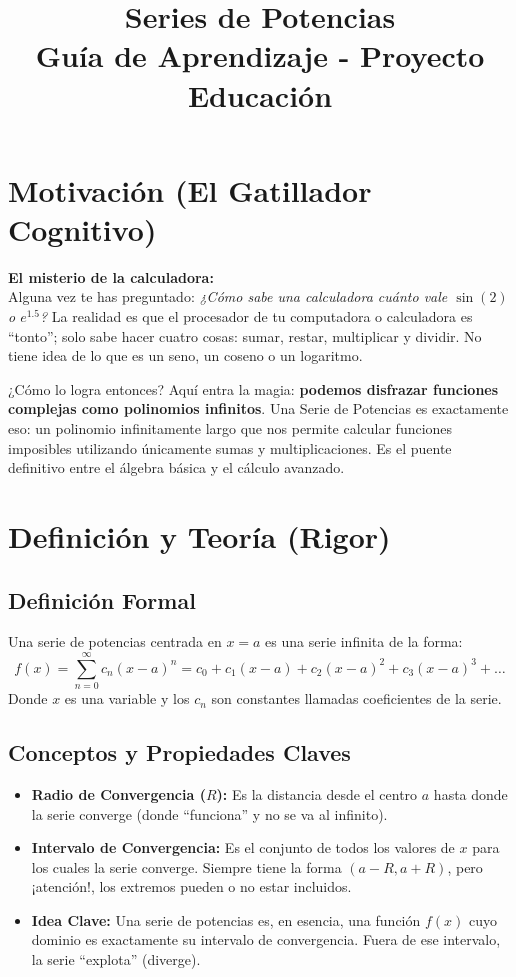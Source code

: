 \documentclass[11pt, a4paper]{article}
\title{\textbf{Series de Potencias}\\ \large Guía de Aprendizaje - Proyecto Educación}
\author{}
\date{}
\begin{document}
\maketitle

\section{Motivación (El Gatillador Cognitivo)}
\textbf{El misterio de la calculadora:}\\
Alguna vez te has preguntado: \textit{¿Cómo sabe una calculadora cuánto vale $\sin(2)$ o $e^{1.5}$?} La realidad es que el procesador de tu computadora o calculadora es ``tonto''; solo sabe hacer cuatro cosas: sumar, restar, multiplicar y dividir. No tiene idea de lo que es un seno, un coseno o un logaritmo.

¿Cómo lo logra entonces? Aquí entra la magia: \textbf{podemos disfrazar funciones complejas como polinomios infinitos}. Una Serie de Potencias es exactamente eso: un polinomio infinitamente largo que nos permite calcular funciones imposibles utilizando únicamente sumas y multiplicaciones. Es el puente definitivo entre el álgebra básica y el cálculo avanzado.

\section{Definición y Teoría (Rigor)}

\subsection*{Definición Formal}
Una serie de potencias centrada en $x = a$ es una serie infinita de la forma:
\[ f(x) = \sum_{n=0}^{\infty} c_n (x - a)^n = c_0 + c_1(x-a) + c_2(x-a)^2 + c_3(x-a)^3 + \dots \]
Donde $x$ es una variable y los $c_n$ son constantes llamadas coeficientes de la serie.

\subsection*{Conceptos y Propiedades Claves}
\begin{itemize}
    \item \textbf{Radio de Convergencia ($R$):} Es la distancia desde el centro $a$ hasta donde la serie converge (donde ``funciona'' y no se va al infinito).
    \item \textbf{Intervalo de Convergencia:} Es el conjunto de todos los valores de $x$ para los cuales la serie converge. Siempre tiene la forma $(a-R, a+R)$, pero ¡atención!, los extremos pueden o no estar incluidos.
    \item \textbf{Idea Clave:} Una serie de potencias es, en esencia, una función $f(x)$ cuyo dominio es exactamente su intervalo de convergencia. Fuera de ese intervalo, la serie ``explota'' (diverge).
\end{itemize}
\end{document}
